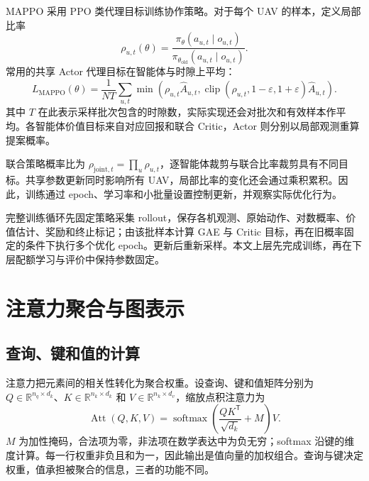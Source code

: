 MAPPO 采用 PPO 类代理目标训练协作策略\cite{yu2022surprising}。对于每个 UAV 的样本，定义局部比率
\begin{equation}
    \rho_{u,t}(\theta)=
    \frac{\pi_\theta(a_{u,t}\mid o_{u,t})}
         {\pi_{\theta_{\mathrm{old}}}(a_{u,t}\mid o_{u,t})}.
    \label{eq:ch2-mappo-ratio}
\end{equation}
常用的共享 Actor 代理目标在智能体与时隙上平均：
\begin{equation}
    L_{\mathrm{MAPPO}}(\theta)=\frac{1}{NT}
    \sum_{u,t}\min\left(\rho_{u,t}\widehat A_{u,t},
      \operatorname{clip}(\rho_{u,t},1-\varepsilon,1+\varepsilon)\widehat A_{u,t}\right).
    \label{eq:ch2-mappo-loss}
\end{equation}
其中 $T$ 在此表示采样批次包含的时隙数，实际实现还会对批次和有效样本作平均。各智能体价值目标来自对应回报和联合 Critic，Actor 则分别以局部观测重算提案概率。

联合策略概率比为 $\rho_{\mathrm{joint},t}=\prod_u\rho_{u,t}$，逐智能体裁剪与联合比率裁剪具有不同目标。共享参数更新同时影响所有 UAV，局部比率的变化还会通过乘积累积。因此，训练通过 epoch、学习率和小批量设置控制更新，并观察实际优化行为。

完整训练循环先固定策略采集 rollout，保存各机观测、原始动作、对数概率、价值估计、奖励和终止标记；由该批样本计算 GAE 与 Critic 目标，再在旧概率固定的条件下执行多个优化 epoch。更新后重新采样。本文上层先完成训练，再在下层配额学习与评价中保持参数固定。

\section{注意力聚合与图表示}
\label{sec:attention}

\subsection{查询、键和值的计算}
\label{sec:ch2-attention-definition}

注意力把元素间的相关性转化为聚合权重\cite{vaswani2017attention}。设查询、键和值矩阵分别为 $Q\in\mathbb R^{n_q\times d_k}$、$K\in\mathbb R^{n_k\times d_k}$ 和 $V\in\mathbb R^{n_k\times d_v}$，缩放点积注意力为
\begin{equation}
    \operatorname{Att}(Q,K,V)
    =\operatorname{softmax}\left(\frac{QK^{\mathsf T}}{\sqrt{d_k}}+M\right)V.
    \label{eq:ch2-scaled-attention}
\end{equation}
$M$ 为加性掩码，合法项为零，非法项在数学表达中为负无穷；softmax 沿键的维度计算。每一行权重非负且和为一，因此输出是值向量的加权组合。查询与键决定权重，值承担被聚合的信息，三者的功能不同。

